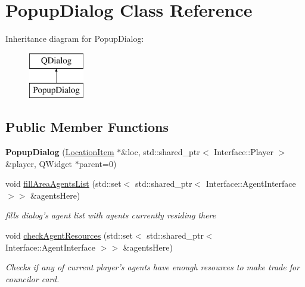 \hypertarget{class_popup_dialog}{\section{Popup\-Dialog Class Reference}
\label{class_popup_dialog}
}
Inheritance diagram for Popup\-Dialog\-:\begin{figure}[H]
\begin{center}
\leavevmode
\includegraphics[height=2.000000cm]{class_popup_dialog}
\end{center}
\end{figure}
\subsection*{Public Member Functions}
\begin{DoxyCompactItemize}
\item 
\hypertarget{class_popup_dialog_a5161bb6334d565f09e824a6483f6fc8e}{{\bfseries Popup\-Dialog} (\hyperlink{class_location_item}{Location\-Item} $\ast$\&loc, std\-::shared\-\_\-ptr$<$ Interface\-::\-Player $>$ \&player, Q\-Widget $\ast$parent=0)}\label{class_popup_dialog_a5161bb6334d565f09e824a6483f6fc8e}

\item 
void \hyperlink{class_popup_dialog_abc7a1bd56e396fa828570ecfdd2035b5}{fill\-Area\-Agents\-List} (std\-::set$<$ std\-::shared\-\_\-ptr$<$ Interface\-::\-Agent\-Interface $>$$>$ \&agents\-Here)
\begin{DoxyCompactList}\small\item\em fills dialog's agent list with agents currently residing there \end{DoxyCompactList}\item 
void \hyperlink{class_popup_dialog_a61bf9175e5ffc57318b3be5a20336b5b}{check\-Agent\-Resources} (std\-::set$<$ std\-::shared\-\_\-ptr$<$ Interface\-::\-Agent\-Interface $>$$>$ \&agents\-Here)
\begin{DoxyCompactList}\small\item\em Checks if any of current player's agents have enough resources to make trade for councilor card. \end{DoxyCompactList}\end{DoxyCompactItemize}


